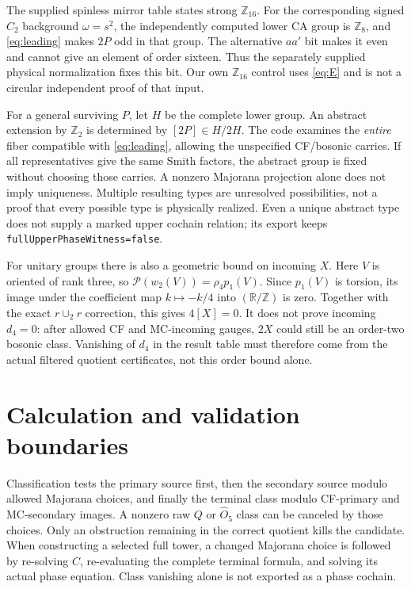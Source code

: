 \documentclass[11pt]{article}
\newcommand{\Z}{\mathbb Z}
\newcommand{\U}{(\mathbb R/\mathbb Z)}
\newcommand{\OO}{\widehat O}
\newcommand{\PP}{\mathcal P}
\newcommand{\pathref}[1]{{\small\nolinkurl{#1}}}
\begin{document}
The supplied spinless mirror table states strong $\Z_{16}$. For the
corresponding signed $C_2$ background $\omega=s^2$, the independently
computed lower CA group is $\Z_8$, and \eqref{eq:leading} makes
$2P$ odd in that group. The alternative $aa'$ bit makes it even and
cannot give an element of order sixteen. Thus the separately supplied
physical normalization fixes this bit. Our own $\Z_{16}$ control uses
\eqref{eq:E} and is not a circular independent proof of that input.

For a general surviving $P$, let $H$ be the complete lower group.
An abstract extension by $\Z_2$ is determined by $[2P]\in H/2H$.
The code examines the \emph{entire} fiber compatible with
\eqref{eq:leading}, allowing the unspecified CF/bosonic carries.
If all representatives give the same Smith factors, the abstract group
is fixed without choosing those carries. A nonzero Majorana projection
alone does not imply uniqueness. Multiple resulting types are unresolved
possibilities, not a proof that every possible type is physically realized.
Even a unique abstract type does not supply a marked upper cochain
relation; its export keeps \pathref{fullUpperPhaseWitness=false}.

For unitary groups there is also a geometric bound on incoming $X$.
Here $V$ is oriented of rank three, so
$\PP(w_2(V))=\rho_4p_1(V)$. Since $p_1(V)$ is torsion, its image
under the coefficient map $k\mapsto-k/4$ into $\U$ is zero.
Together with the exact $r\cup_2r$ correction, this gives $4[X]=0$.
It does not prove incoming $d_4=0$: after allowed CF and MC-incoming
gauges, $2X$ could still be an order-two bosonic class. Vanishing of
$d_4$ in the result table must therefore come from the actual filtered
quotient certificates, not this order bound alone.

\newpage
\section{Calculation and validation boundaries}
Classification tests the primary source first, then the secondary
source modulo allowed Majorana choices, and finally the terminal
class modulo CF-primary and MC-secondary images. A nonzero raw
$Q$ or $\OO_5$ class can be canceled by those choices. Only an
obstruction remaining in the correct quotient kills the candidate.
When constructing a selected full tower, a changed Majorana choice
is followed by re-solving $C$, re-evaluating the complete terminal
formula, and solving its actual phase equation. Class vanishing alone
is not exported as a phase cochain.
\end{document}
